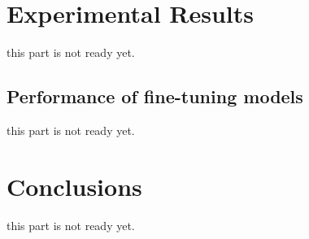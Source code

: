 \documentclass[sigconf]{acmart}
\begin{document}
\section{Experimental Results}\label{results}
this part is not ready yet.





\subsection{Performance of fine-tuning models}
this part is not ready yet.









\section{Conclusions}\label{conclusions}
this part is not ready yet.




 
\end{document}
